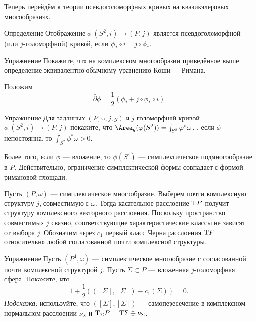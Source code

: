 Теперь перейдём к теории псевдоголоморфных кривых на квазикэлеровых многообразиях.

\begin{ex*}{Определение}
Отображение $\phi\:(S^2, i) \to (P, j)$ является псевдоголоморфной
(или $j$-голоморфной) кривой, если  
$\phi_\ast \circ i = j \circ \phi_\ast$.
\end{ex*}

\begin{ex}{Упражнение}\label{10.2.D}
Покажите, что на комплексном многообразии приведённое выше определение
эквивалентно обычному уравнению Коши --- Римана.
\end{ex}

Положим 
\[\bar\partial\phi=\frac12(\phi_\ast+j\circ\phi_\ast\circ i)\]

\begin{ex}[(ср. \ref{4.1.A})]{Упражнение}\label{10.2.E}
Для заданных $(P, \omega, j, g)$ и $j$-го\-ло\-морф\-ной кривой $\phi
\: (S^2, i) \to (P, j)$ покажите, что $\Area_g (\phi(S^2)) =
\int_{S^2}\phi^\ast \omega$. 
, если $\phi$ непостоянна, то $\int_{S^2} \phi^\ast \omega
> 0$.  
\end{ex}

Более того, если $\phi$ --- вложение, то $\phi(S^2)$ ---
симплектическое подмногообразие в $P$. 
Действительно, ограничение симплектической формы совпадает с формой
римановой площади. 

Пусть $(P, \omega)$ --- симплектическое многообразие.
Выберем почти комплексную структуру $j$, совместимую с $\omega$.
Тогда касательное расслоение $\mathrm{T} P$ получит структуру комплексного
векторного расслоения. 
Поскольку пространство совместимых $j$ связно, соответствующие
характеристические классы не зависят от выбора $j$. 
Обозначим через $c_1$ первый класс Черна расслоения $\mathrm{T} P$
относительно любой согласованной почти комплексной структуры. 

\begin{ex}{Упражнение}\label{10.2.F}
Пусть $(P^4, \omega)$ --- симплектическое многообразие с согласованной
почти комплексной структурой $j$. 
Пусть $\Sigma \subset P$ --- вложенная $j$-голоморфная сфера.
Покажите, что
\[1 +\frac12 (([\Sigma], [\Sigma]) - c_1 (\Sigma)) = 0.\]
\emph{Подсказка:} используйте, что $([\Sigma], [\Sigma])$ ---
самопересечение в комплексном нормальном расслоении $\nu_\Sigma$ и
$\mathrm{T}_\Sigma P = \mathrm{T}\Sigma \oplus \nu_\Sigma$. 
\end{ex}


